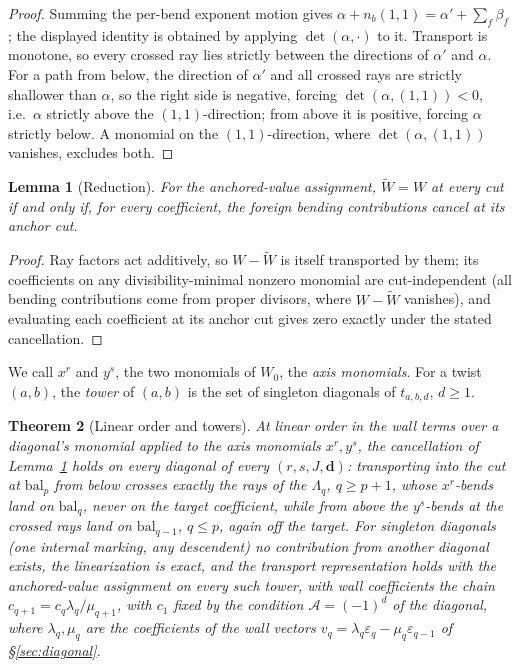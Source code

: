 \documentclass[11pt]{amsart}
\newtheorem{theorem}{Theorem}[section]
\newtheorem{lemma}[theorem]{Lemma}
\theoremstyle{definition}
\theoremstyle{remark}
\newcommand{\Ascr}{\mathcal{A}}
\begin{document}
\begin{proof}
Summing the per-bend exponent motion gives
$\alpha+n_b(1,1)=\alpha'+\sum_{f}\beta_{f}$; the displayed identity is obtained
by applying $\det(\alpha,\cdot)$ to it. Transport is monotone, so every crossed ray lies strictly
between the directions of $\alpha'$ and $\alpha$. For a path from below, the
direction of $\alpha'$ and all crossed rays are strictly shallower than $\alpha$, so the right side is
negative, forcing $\det(\alpha,(1,1))<0$, i.e.\ $\alpha$ strictly above
the $(1,1)$-direction; from above it is positive, forcing $\alpha$ strictly below. A monomial on the
$(1,1)$-direction, where $\det(\alpha,(1,1))$ vanishes, excludes both.
\end{proof}

\begin{lemma}[Reduction]
\label{lem:reduction}
For the anchored-value assignment, $\widetilde W=W$ at every cut if and only if, for
every coefficient, the foreign bending contributions cancel at its anchor cut.
\end{lemma}

\begin{proof}
Ray factors act additively, so $W-\widetilde W$ is itself transported by them; its
coefficients on any divisibility-minimal nonzero monomial are
cut-independent (all bending contributions come from proper divisors, where
$W-\widetilde W$ vanishes), and evaluating each coefficient at its anchor cut gives zero
exactly under the stated cancellation.
\end{proof}

We call $x^{r}$ and $y^{s}$, the two monomials of $W_0$, the \emph{axis
monomials}.  For a twist $(a,b)$, the \emph{tower} of $(a,b)$ is the set
of singleton diagonals of $t_{a,b,d}$, $d\ge1$.

\begin{theorem}[Linear order and towers]
\label{thm:linearorder}
At linear order in the wall terms over a diagonal's monomial applied to the axis
monomials $x^{r},y^{s}$, the cancellation of
Lemma~\ref{lem:reduction} holds on every diagonal of every
$(r,s,J,\mathbf d)$: transporting into the cut at $\mathrm{bal}_{p}$ from below
crosses exactly the rays of the $\Lambda_{q}$, $q\ge p{+}1$, whose $x^{r}$-bends
land on $\mathrm{bal}_{q}$, never on the target coefficient, while from above
the $y^{s}$-bends at the crossed rays land on $\mathrm{bal}_{q-1}$, $q\le p$, again off
the target. For singleton
diagonals (one internal marking, any descendent) no contribution from another
diagonal exists,
the linearization is exact, and the transport representation holds with the
anchored-value assignment on every such tower, with wall coefficients the
chain $c_{q+1}=c_{q}\lambda_{q}/\mu_{q+1}$, with $c_1$ fixed by the condition
$\Ascr=(-1)^{d}$ of the diagonal, where
$\lambda_q,\mu_q$ are the coefficients of the wall vectors
$v_q=\lambda_q\varepsilon_q-\mu_q\varepsilon_{q-1}$ of \S\ref{sec:diagonal}.
\end{theorem}
\end{document}
